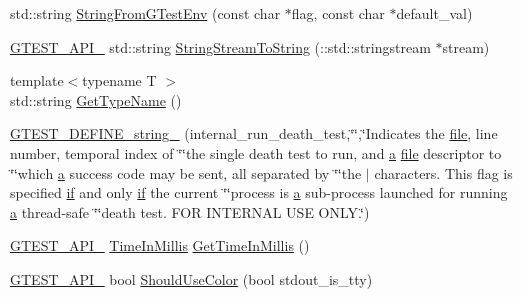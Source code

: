 \begin{DoxyCompactItemize}
\item 
std\+::string \hyperlink{namespacetesting_1_1internal_ac54dabc540bf79c2de91add679bfb93b}{String\+From\+G\+Test\+Env} (const char $\ast$flag, const char $\ast$default\+\_\+val)
\item 
\hyperlink{gtest-port_8h_aa73be6f0ba4a7456180a94904ce17790}{G\+T\+E\+S\+T\+\_\+\+A\+P\+I\+\_\+} std\+::string \hyperlink{namespacetesting_1_1internal_ac0a2b7f69fc829d80a39e925b6417e39}{String\+Stream\+To\+String} (\+::std\+::stringstream $\ast$stream)
\item 
{\footnotesize template$<$typename T $>$ }\\std\+::string \hyperlink{namespacetesting_1_1internal_a635606b4731f843c86ec8ca51cab83a1}{Get\+Type\+Name} ()
\item 
\hyperlink{namespacetesting_1_1internal_a1b4d550272b7346726a5b4976d5c7aca}{G\+T\+E\+S\+T\+\_\+\+D\+E\+F\+I\+N\+E\+\_\+string\+\_\+} (internal\+\_\+run\+\_\+death\+\_\+test,\char`\"{}\char`\"{},\char`\"{}Indicates the \hyperlink{_07copy_08_2_read_camera_model_8m_a151631b2fd2bb776ef06c9f440a7ed74}{file}, line number, temporal index of \char`\"{}\char`\"{}the single death test to run, and \hyperlink{_07copy_08_2_read_camera_model_8m_a551a3d351eadcc0b9b1a2f24f0fb5ea0}{a} \hyperlink{_07copy_08_2_read_camera_model_8m_a151631b2fd2bb776ef06c9f440a7ed74}{file} descriptor to \char`\"{}\char`\"{}which \hyperlink{_07copy_08_2_read_camera_model_8m_a551a3d351eadcc0b9b1a2f24f0fb5ea0}{a} success code may be sent, all separated by \char`\"{}\char`\"{}the \textquotesingle{}$\vert$\textquotesingle{} characters.  This flag is specified \hyperlink{jquery_8js_a42cbfadee2b4749e8f699ea8d745a0e4}{if} and only \hyperlink{jquery_8js_a42cbfadee2b4749e8f699ea8d745a0e4}{if} the current \char`\"{}\char`\"{}process is \hyperlink{_07copy_08_2_read_camera_model_8m_a551a3d351eadcc0b9b1a2f24f0fb5ea0}{a} sub-\/process launched for running \hyperlink{_07copy_08_2_read_camera_model_8m_a551a3d351eadcc0b9b1a2f24f0fb5ea0}{a} thread-\/safe \char`\"{}\char`\"{}death test.  F\+OR I\+N\+T\+E\+R\+N\+AL U\+SE O\+N\+L\+Y.\char`\"{})
\item 
\hyperlink{gtest-port_8h_aa73be6f0ba4a7456180a94904ce17790}{G\+T\+E\+S\+T\+\_\+\+A\+P\+I\+\_\+} \hyperlink{namespacetesting_1_1internal_a66a845df404b38fe85c5e14a069f255a}{Time\+In\+Millis} \hyperlink{namespacetesting_1_1internal_ae66b46943a429e6efb1db456d4cae90c}{Get\+Time\+In\+Millis} ()
\item 
\hyperlink{gtest-port_8h_aa73be6f0ba4a7456180a94904ce17790}{G\+T\+E\+S\+T\+\_\+\+A\+P\+I\+\_\+} bool \hyperlink{namespacetesting_1_1internal_ac1db1b4603967a6c4404f31cbbac31a6}{Should\+Use\+Color} (bool stdout\+\_\+is\+\_\+tty)

\end{DoxyCompactItemize}
